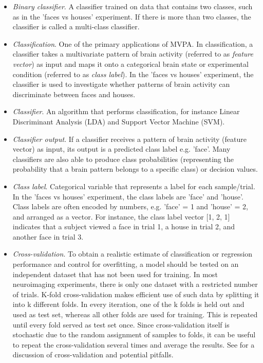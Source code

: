 \documentclass[utf8]{frontiersSCNS} %
\begin{document}
\begin{itemize}
\item \textit{Binary classifier}. A classifier trained on data that contains two classes, such as in the 'faces vs houses' experiment. If there is more than two classes, the classifier is called a multi-class classifier.
\item \textit{Classification}. One of the primary applications of MVPA. In classification, a classifier takes a multivariate pattern of brain activity (referred to as \textit{feature vector}) as input and maps it onto a categorical brain state or experimental condition (referred to as \textit{class label}). In the 'faces vs houses' experiment, the classifier is used to investigate whether patterns of brain activity  can discriminate between faces and houses.
\item \textit{Classifier}. An algorithm that performs classification, for instance Linear Discriminant Analysis (LDA) and Support Vector Machine (SVM).
\item \textit{Classifier output}. If a classifier receives a pattern of brain activity (feature vector) as input, its output is a predicted class label e.g. 'face'. Many classifiers are also able to produce class probabilities (representing the probability that a brain pattern belongs to a specific class) or decision values.
\item \textit{Class label}. Categorical variable that represents a label for each sample/trial. In the 'faces vs houses' experiment, the class labels are 'face' and 'house'. Class labels are often encoded by numbers, e.g. 'face' = 1 and 'house' = 2, and arranged as a vector. For instance, the class label vector  [1, 2, 1] indicates that a subject viewed a face in trial 1, a house in trial 2, and another face in trial 3.
\item \textit{Cross-validation}. To obtain a realistic estimate of classification or regression performance and control for overfitting, a model should be tested on an independent dataset that has not been used for training. In most neuroimaging experiments, there is only one dataset with a restricted number of trials. K-fold cross-validation makes efficient use of such data by splitting it into k different folds. In every iteration, one of the k folds is held out and used as test set, whereas all other folds are used for training. This is repeated until every fold served as test set once. Since cross-validation itself is stochastic due to the random assignment of samples to folds, it can be useful to repeat the cross-validation several times and average the results. See \cite{Lemm2011,Varoquaux2017} for a discussion of cross-validation and potential pitfalls.

\end{itemize}
\end{document}
